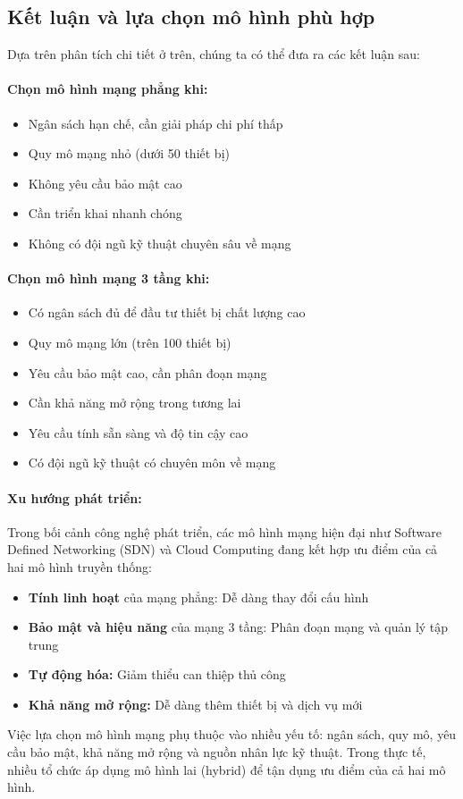 \subsection{Kết luận và lựa chọn mô hình phù hợp}

Dựa trên phân tích chi tiết ở trên, chúng ta có thể đưa ra các kết luận sau:

\paragraph{Chọn mô hình mạng phẳng khi:}
\begin{itemize}
    \item Ngân sách hạn chế, cần giải pháp chi phí thấp
    \item Quy mô mạng nhỏ (dưới 50 thiết bị)
    \item Không yêu cầu bảo mật cao
    \item Cần triển khai nhanh chóng
    \item Không có đội ngũ kỹ thuật chuyên sâu về mạng
\end{itemize}

\paragraph{Chọn mô hình mạng 3 tầng khi:}
\begin{itemize}
    \item Có ngân sách đủ để đầu tư thiết bị chất lượng cao
    \item Quy mô mạng lớn (trên 100 thiết bị)
    \item Yêu cầu bảo mật cao, cần phân đoạn mạng
    \item Cần khả năng mở rộng trong tương lai
    \item Yêu cầu tính sẵn sàng và độ tin cậy cao
    \item Có đội ngũ kỹ thuật có chuyên môn về mạng
\end{itemize}

\paragraph{Xu hướng phát triển:}
Trong bối cảnh công nghệ phát triển, các mô hình mạng hiện đại như Software Defined Networking (SDN) và Cloud Computing đang kết hợp ưu điểm của cả hai mô hình truyền thống:
\begin{itemize}
    \item \textbf{Tính linh hoạt} của mạng phẳng: Dễ dàng thay đổi cấu hình
    \item \textbf{Bảo mật và hiệu năng} của mạng 3 tầng: Phân đoạn mạng và quản lý tập trung
    \item \textbf{Tự động hóa:} Giảm thiểu can thiệp thủ công
    \item \textbf{Khả năng mở rộng:} Dễ dàng thêm thiết bị và dịch vụ mới
\end{itemize}

Việc lựa chọn mô hình mạng phụ thuộc vào nhiều yếu tố: ngân sách, quy mô, yêu cầu bảo mật, khả năng mở rộng và nguồn nhân lực kỹ thuật. Trong thực tế, nhiều tổ chức áp dụng mô hình lai (hybrid) để tận dụng ưu điểm của cả hai mô hình.

